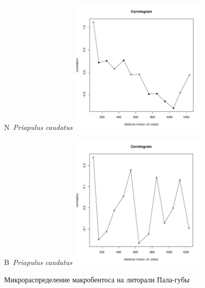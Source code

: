 \documentclass[12pt, a4paper]{disser}
\begin{document}
\begin{figure}[h]
	\begin{minipage}[b]{.46\linewidth}
	\begin{center}
	{\small N~{\it Priapulus caudatus}}
		\includegraphics[width=65mm]{../Barenc_Sea/distribution_Moran/Pala_moran_N_Priapulus_caudatus_.pdf}
	\end{center}
	\end{minipage}
%
	\hfil %
%
	\begin{minipage}[b]{.46\linewidth}
	\begin{center}
	{\small B~{\it Priapulus caudatus}}
		\includegraphics[width=65mm]{../Barenc_Sea/distribution_Moran/Pala_moran_B_Priapulus_caudatus_.pdf}
	\end{center}
	\end{minipage}



	\caption{Микрораспределение макробентоса на литорали Пала-губы}
	\label{ris:moransI_Pala}
	\end{figure}
\end{document}
